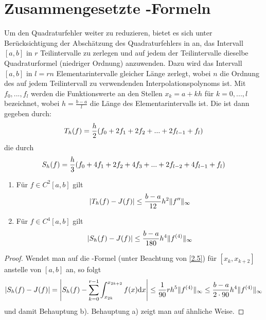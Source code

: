 \section{Zusammengesetzte -Formeln}

Um den Quadraturfehler weiter zu reduzieren, bietet es sich unter Berücksichtigung der Abschätzung des Quadraturfehlers in  an, das Intervall $[a,b]$ in $r$ Teilintervalle zu zerlegen und auf jedem der Teilintervalle dieselbe Quadraturformel (niedriger Ordnung) anzuwenden. Dazu wird das Intervall $[a,b]$ in $l=rn$ Elementarintervalle gleicher Länge zerlegt, wobei $n$ die Ordnung des auf jedem Teilintervall zu verwendenden Interpolationspolynoms ist. Mit $f_0,...,f_l$ werden die Funktionswerte an den Stellen $x_k=a+kh$ für $k=0,...,l$ bezeichnet, wobei $h=\frac{b-a}{l}$ die Länge des Elementarintervalls ist. Die  ist dann gegeben durch:
\begin{align}
	T_h(f) = \frac{h}{2}(f_0+2f_1+2f_2+...+2f_{l-1}+f_l)\notag
\end{align}
die  durch
\begin{align}
	S_h(f) = \frac{h}{3}(f_0+4f_1+2f_2+4f_3+...+2f_{l-2}+4f_{l-1}+f_l)\notag
\end{align}

\begin{proposition}
	\begin{enumerate}[label=(\alph*)]
		\item Für $f\in C^2[a,b]$ gilt
		\begin{align}
			\vert T_h(f) - J(f)\vert \le \frac{b-a}{12}h^2\Vert f''\Vert_\infty\notag
		\end{align}
		\item Für $f\in C^4[a,b]$ gilt
		\begin{align}
			\vert S_h(f) - J(f)\vert \le \frac{b-a}{180}h^4\Vert f^{(4)}\Vert_\infty\notag
		\end{align}
	\end{enumerate}
\end{proposition}
\begin{proof}
	Wendet man  auf die -Formel (unter Beachtung von \cref{2.5}) für $[x_k,x_{k+2}]$ anstelle von $[a,b]$ an, so folgt
	\begin{align}
		\vert S_h(f)-J(f)\vert = \left| S_h(f)-\sum_{k=0}^{r-1} \int_{x_{2k}}^{x_{2k+2}} f(x)\mathrm{d} x\right| \le \frac{1}{90} rh^5 \Vert f^{(4)}\Vert_\infty \le \frac{b-a}{2\cdot 90} h^4\Vert f^{(4)}\Vert_\infty\notag
	\end{align}
	und damit Behauptung b). Behauptung a) zeigt man auf ähnliche Weise.
\end{proof}